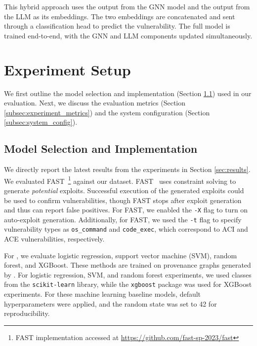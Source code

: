 \documentclass[12pt,openany,oneside,table]{cmuthesis}
\begin{document}
This hybrid approach uses the output from the GNN model and the output from the LLM as its embeddings. The two embeddings are concatenated and sent through a classification head to predict the vulnerability. The full model is trained end-to-end, with the GNN and LLM components updated simultaneously.


\section{Experiment Setup}
We first outline the model selection and implementation (Section \ref{subsec:model_selection}) used in our evaluation. Next, we discuss the evaluation metrics (Section \ref{subsec:experiment_metrics}) and the system configuration (Section \ref{subsec:system_config}).



\subsection{Model Selection and Implementation}\label{subsec:model_selection}

We directly report the latest results from the \nodemedicfine experiments in Section \ref{sec:results}. We evaluated FAST~\footnote{FAST implementation accessed at \url{https://github.com/fast-sp-2023/fast}}
against our dataset. 
FAST~\cite{kang2023scaling} uses constraint solving to generate \emph{potential} exploits. Successful execution of the generated exploits could be used to confirm vulnerabilities, though FAST stops after exploit generation and thus can report false positives. 
For FAST, we enabled the \texttt{-X} flag to turn on auto-exploit generation. 
Additionally, for FAST, we used the \texttt{-t} flag to specify vulnerability types as \texttt{os\_command} and \texttt{code\_exec}, which correspond to ACI and ACE vulnerabilities, respectively.


For , we evaluate %
logistic regression, support vector machine (SVM), random forest, and XGBoost. These methods are trained on provenance graphs generated by \nodemedicfine. For logistic regression, SVM, and random forest experiments, we used classes from the \texttt{scikit-learn} library, while the \texttt{xgboost} package was used for XGBoost experiments. For these machine learning baseline models, default hyperparameters were applied, and the random state was set to 42 for reproducibility.
\end{document}

